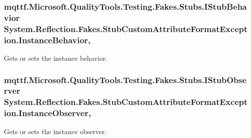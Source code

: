 \hypertarget{class_system_1_1_reflection_1_1_fakes_1_1_stub_custom_attribute_format_exception_aeb175bfb22846535a939a14ae023eabe}{
\subsubsection[{Instance\-Behavior}]{\setlength{\rightskip}{0pt plus 5cm}mqttf.\-Microsoft.\-Quality\-Tools.\-Testing.\-Fakes.\-Stubs.\-I\-Stub\-Behavior System.\-Reflection.\-Fakes.\-Stub\-Custom\-Attribute\-Format\-Exception.\-Instance\-Behavior\hspace{0.3cm}{\ttfamily [get]}, {\ttfamily [set]}}}\label{class_system_1_1_reflection_1_1_fakes_1_1_stub_custom_attribute_format_exception_aeb175bfb22846535a939a14ae023eabe}


Gets or sets the instance behavior.

\hypertarget{class_system_1_1_reflection_1_1_fakes_1_1_stub_custom_attribute_format_exception_a92b1b76bf5f884286f8671244db653ba}{
\subsubsection[{Instance\-Observer}]{\setlength{\rightskip}{0pt plus 5cm}mqttf.\-Microsoft.\-Quality\-Tools.\-Testing.\-Fakes.\-Stubs.\-I\-Stub\-Observer System.\-Reflection.\-Fakes.\-Stub\-Custom\-Attribute\-Format\-Exception.\-Instance\-Observer\hspace{0.3cm}{\ttfamily [get]}, {\ttfamily [set]}}}\label{class_system_1_1_reflection_1_1_fakes_1_1_stub_custom_attribute_format_exception_a92b1b76bf5f884286f8671244db653ba}


Gets or sets the instance observer.

